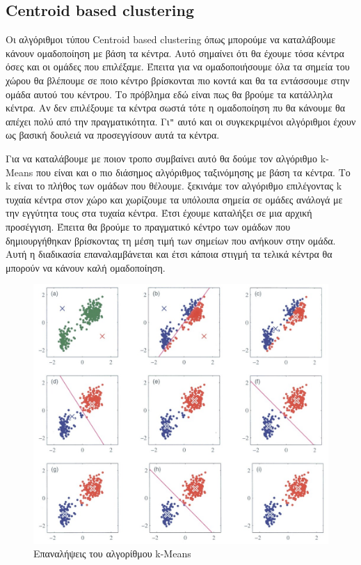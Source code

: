 \subsection{\textlatin{Centroid based clustering}}
Οι αλγόριθμοι τύπου \textlatin{Centroid based clustering} όπως μπορούμε να καταλάβουμε κάνουν ομαδοποίηση με βάση τα κέντρα. Αυτό σημαίνει ότι θα έχουμε τόσα κέντρα όσες και οι ομάδες που επιλέξαμε.
Έπειτα για να ομαδοποιήσουμε όλα τα σημεία του χώρου θα βλέπουμε σε ποιο κέντρο βρίσκονται πιο κοντά και θα τα εντάσσουμε στην ομάδα αυτού του κέντρου. Το πρόβλημα εδώ είναι πως θα βρούμε τα
κατάλληλα κέντρα. Αν δεν επιλέξουμε τα κέντρα σωστά τότε η ομαδοποίηση πυ θα κάνουμε θα απέχει πολύ από την πραγματικότητα. Γι\texttt{"} αυτό και οι συγκεκριμένοι αλγόριθμοι έχουν ως βασική δουλειά να
προσεγγίσουν αυτά τα κέντρα.\par Για να καταλάβουμε με ποιον τροπο συμβαίνει αυτό θα δούμε τον αλγόριθμο \textlatin{k-Means} που είναι και ο πιο διάσημος αλγόριθμος ταξινόμησης με βάση τα κέντρα.
Το \textlatin{k} είναι το πλήθος των ομάδων που θέλουμε. ξεκινάμε τον αλγόριθμο επιλέγοντας \textlatin{k} τυχαία κέντρα στον χώρο και χωρίζουμε τα υπόλοιπα σημεία σε ομάδες ανάλογά με την εγγύτητα
τους στα τυχαία κέντρα. Έτσι έχουμε καταλήξει σε μια αρχική προσέγγιση. Έπειτα θα βρούμε το πραγματικό κέντρο των ομάδων που δημιουργήθηκαν βρίσκοντας τη μέση τιμή των σημείων που ανήκουν στην
ομάδα. Αυτή η διαδικασία επαναλαμβάνεται και έτσι κάποια στιγμή τα τελικά κέντρα θα μπορούν να κάνουν καλή ομαδοποίηση.
\begin{figure}[H]
    \centering
    \includegraphics[width=1\textwidth]{images/kmeans.jpg}
    \caption{Επαναλήψεις του αλγορίθμου \textlatin{k-Means}}
\end{figure}
